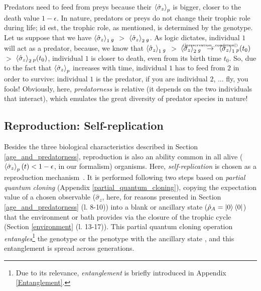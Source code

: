 \documentclass[11pt]{article}
\numberwithin{equation}{section} %
\numberwithin{figure}{section} %
\begin{document}
 Predators need to feed from preys because their $\braket{\hat{\sigma}_z}_p$ is bigger, closer to the death value $1-\epsilon$. In nature, predators or preys do not change their trophic role during life; id est, the trophic role, as mentioned, is determined by the genotype. Let us suppose that we have $\braket{\hat{\sigma}_z}_1{_{g}}$ $>$ $\braket{\hat{\sigma}_z}_2{_{g}}$. As logic dictates, individual $1$ will act as a predator, because, we know that $\braket{\hat{\sigma}_z}_1{_{g}}$ $>$ $\braket{\hat{\sigma}_z}_2{_{g}}$ $\,\,\newcommand\myeq1{\mathrel{\stackrel{\makebox[0pt]{\mbox{\normalfont\tiny \textrm{(\ref{preservation_condition})}}}}{\rightarrow}}}\,\,$ $\braket{\hat{\sigma}_z}_1{_{p}}(t_0)$ $>$ $\braket{\hat{\sigma}_z}_2{_{p}}(t_0)$, individual $1$ is closer to death, even from its birth time $t_0$. So, due to the fact that $\braket{\hat{\sigma}_z}_{p}$ increases with time, individual $1$ has to feed from $2$ in order to survive: individual $1$ is the predator, if you are individual $2$, ... fly, you fools! Obviously, here, \emph{predatorness} is relative (it depends on the two individuals that interact), which emulates the great diversity of predator species in nature! 
  
\subsection{Reproduction: Self-replication} \label{self-replication}

Besides the three biological characteristics described in Section \ref{age_and_predatorness}, reproduction is also an ability common in all alive ($\braket{\hat{\sigma}_z}_p(t)<1-\epsilon$, in our formalism) organisms. Here, \emph{self-replication} is chosen as a reproduction mechanism $\,$\cite[p.~2, l.~16-23]{QAL_IBM}. It is performed following two steps based on \emph{partial quantum cloning} (Appendix \ref{partial_quantum_cloning}), copying the expectation value of a chosen observable ($\hat{\sigma}_z$, here, for reasons presented in Section \ref{age_and_predatorness} (l. 8-10)) into a blank or ancillary state ($\hat{\rho}_A=\ket{0}\bra{0}$) $\,$ \cite[p.~2, l.~16-17]{QAL_IBM} that the environment or bath provides via the closure of the trophic cycle (Section \ref{environment} (l. 13-17)). This partial quantum cloning operation \emph{entangles}\footnote{Due to its relevance, \emph{entanglement} is briefly introduced in Appendix \ref{Entanglement}.} the genotype or the penotype with the ancillary state \cite[p.~2, l.~17-18]{QAL_IBM}, and this entanglement is spread across generations.
\end{document}
